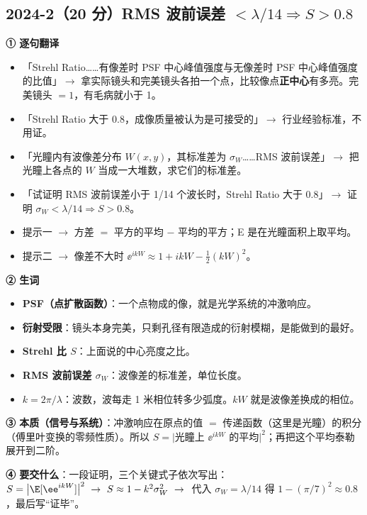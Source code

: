 \subsection{2024-2（20 分）RMS 波前误差 $<\lambda/14\Rightarrow S>0.8$}\label{ex:2024-2}
\label{rd:2024-2}
\begin{idea}[读题：这道题在说什么]
\textbf{① 逐句翻译}
\begin{itemize}
\item 「Strehl Ratio……有像差时 PSF 中心峰值强度与无像差时 PSF 中心峰值强度的比值」$\to$ 拿实际镜头和完美镜头各拍一个点，比较像点\textbf{正中心}有多亮。完美镜头 $=1$，有毛病就小于 1。
\item 「Strehl Ratio 大于 0.8，成像质量被认为是可接受的」$\to$ 行业经验标准，不用证。
\item 「光瞳内有波像差分布 $W(x,y)$，其标准差为 $\sigma_W$……RMS 波前误差」$\to$ 把光瞳上各点的 $W$ 当成一大堆数，求它们的标准差。
\item 「试证明 RMS 波前误差小于 1/14 个波长时，Strehl Ratio 大于 0.8」$\to$ 证明 $\sigma_W<\lambda/14\Rightarrow S>0.8$。
\item 提示一 $\to$ 方差 $=$ 平方的平均 $-$ 平均的平方；E 是在光瞳面积上取平均。
\item 提示二 $\to$ 像差不大时 $\ee^{ikW}\approx1+ikW-\frac12(kW)^2$。
\end{itemize}
\textbf{② 生词}
\begin{itemize}
\item \textbf{PSF（点扩散函数）}：一个点物成的像，就是光学系统的冲激响应。
\item \textbf{衍射受限}：镜头本身完美，只剩孔径有限造成的衍射模糊，是能做到的最好。
\item \textbf{Strehl 比 $S$}：上面说的中心亮度之比。
\item \textbf{RMS 波前误差 $\sigma_W$}：波像差的标准差，单位长度。
\item \textbf{$k=2\pi/\lambda$}：波数，波每走 1 米相位转多少弧度。$kW$ 就是波像差换成的相位。
\end{itemize}
\textbf{③ 本质（信号与系统）}：冲激响应在原点的值 $=$ 传递函数（这里是光瞳）的积分（傅里叶变换的零频性质）。所以 $S=\big|\text{光瞳上 }\ee^{ikW}\text{ 的平均}\big|^2$；再把这个平均泰勒展开到二阶。

\textbf{④ 要交什么}：一段证明，三个关键式子依次写出：
$S=\big|\E[\ee^{ikW}]\big|^2\ \to\ S\approx1-k^2\sigma_W^2\ \to\ $ 代入 $\sigma_W=\lambda/14$ 得 $1-(\pi/7)^2\approx0.8$，最后写“证毕”。
\end{idea}

